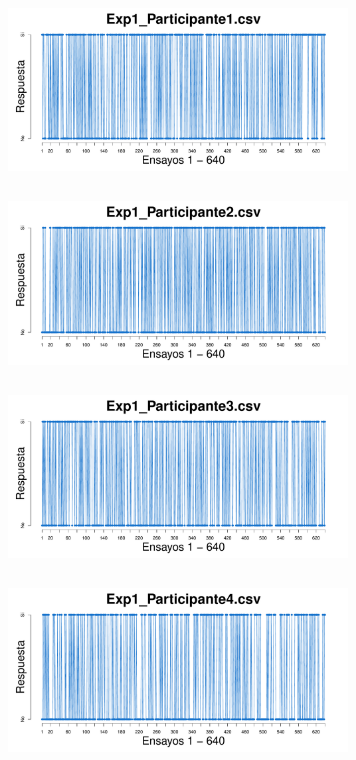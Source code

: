 \documentclass[a4paper ]{article}
\begin{document}
\vspace{3mm}
\begin{figure}[th]
\centering
\includegraphics[width=9cm, height=5cm]{Figures/Response_Exp1_P1} \includegraphics[width=9cm, height=5cm]{Figures/Response_Exp1_P2} 
\includegraphics[width=9cm, height=5cm]{Figures/Response_Exp1_P3} \includegraphics[width=9cm, height=5cm]{Figures/Response_Exp1_P4} 

\end{figure}
\end{document}
